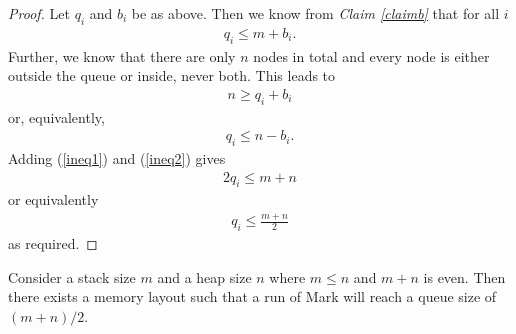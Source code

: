 \documentclass{article}
\begin{document}
\begin{proof}
    Let $q_i$ and $b_i$ be as above. Then we know from \emph{Claim \ref{claimb}}
    that for all $i$
    \begin{align}
        \label{ineq1}
        q_i \leq m + b_i.
    \end{align}
    Further, we know that there are only $n$ nodes in total and every node
    is either outside the queue or inside, never both. This leads to
    \begin{align*}
        n \geq q_i + b_i
    \end{align*}
    or, equivalently,
    \begin{align}
        \label{ineq2}
        q_i \leq n-b_i.
    \end{align}
    Adding (\ref{ineq1}) and (\ref{ineq2}) gives
    \begin{align*}
        2q_i \leq m + n
    \end{align*}
    or equivalently
    \begin{align*}
        q_i \leq \frac{m+n}{2}
    \end{align*}
    as required.
\end{proof}

\begin{claim}
    Consider a stack size $m$ and a heap size $n$ where $m\leq n$ and
    $m+n$ is even. Then there exists a memory layout such that a run of Mark 
    will reach a queue size of $(m+n)/2$.
\end{claim}
\end{document}
